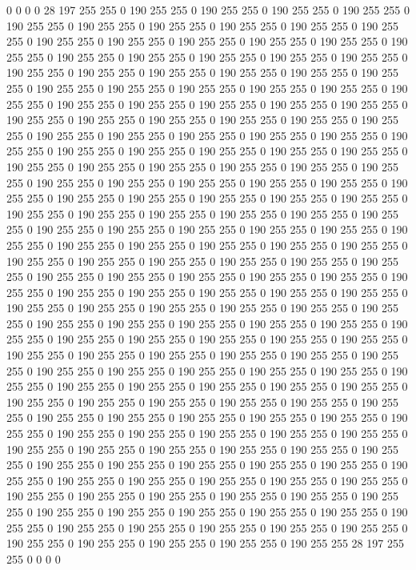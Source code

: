 0 0 0 0 28 197 255 255 0 190 255 255 0 190 255 255 0 190 255 255 0 190 255 255 0 190 255 255 0 190 255 255 0 190 255 255 0 190 255 255 0 190 255 255 0 190 255 255 0 190 255 255 0 190 255 255 0 190 255 255 0 190 255 255 0 190 255 255 0 190 255 255 0 190 255 255 0 190 255 255 0 190 255 255 0 190 255 255 0 190 255 255 0 190 255 255 0 190 255 255 0 190 255 255 0 190 255 255 0 190 255 255 0 190 255 255 0 190 255 255 0 190 255 255 0 190 255 255 0 190 255 255 0 190 255 255 0 190 255 255 0 190 255 255 0 190 255 255 0 190 255 255 0 190 255 255 0 190 255 255 0 190 255 255 0 190 255 255 0 190 255 255 0 190 255 255 0 190 255 255 0 190 255 255 0 190 255 255 0 190 255 255 0 190 255 255 0 190 255 255 
0 190 255 255 0 190 255 255 0 190 255 255 0 190 255 255 0 190 255 255 0 190 255 255 0 190 255 255 0 190 255 255 0 190 255 255 0 190 255 255 0 190 255 255 0 190 255 255 0 190 255 255 0 190 255 255 0 190 255 255 0 190 255 255 0 190 255 255 0 190 255 255 0 190 255 255 0 190 255 255 0 190 255 255 0 190 255 255 0 190 255 255 0 190 255 255 0 190 255 255 0 190 255 255 0 190 255 255 0 190 255 255 0 190 255 255 0 190 255 255 0 190 255 255 0 190 255 255 0 190 255 255 0 190 255 255 0 190 255 255 0 190 255 255 0 190 255 255 0 190 255 255 0 190 255 255 0 190 255 255 0 190 255 255 0 190 255 255 0 190 255 255 0 190 255 255 0 190 255 255 0 190 255 255 0 190 255 255 0 190 255 255 0 190 255 255 0 190 255 255 
0 190 255 255 0 190 255 255 0 190 255 255 0 190 255 255 0 190 255 255 0 190 255 255 0 190 255 255 0 190 255 255 0 190 255 255 0 190 255 255 0 190 255 255 0 190 255 255 0 190 255 255 0 190 255 255 0 190 255 255 0 190 255 255 0 190 255 255 0 190 255 255 0 190 255 255 0 190 255 255 0 190 255 255 0 190 255 255 0 190 255 255 0 190 255 255 0 190 255 255 0 190 255 255 0 190 255 255 0 190 255 255 0 190 255 255 0 190 255 255 0 190 255 255 0 190 255 255 0 190 255 255 0 190 255 255 0 190 255 255 0 190 255 255 0 190 255 255 0 190 255 255 0 190 255 255 0 190 255 255 0 190 255 255 0 190 255 255 0 190 255 255 0 190 255 255 0 190 255 255 0 190 255 255 0 190 255 255 0 190 255 255 0 190 255 255 0 190 255 255 
0 190 255 255 0 190 255 255 0 190 255 255 0 190 255 255 0 190 255 255 0 190 255 255 0 190 255 255 0 190 255 255 0 190 255 255 0 190 255 255 0 190 255 255 0 190 255 255 0 190 255 255 0 190 255 255 0 190 255 255 0 190 255 255 0 190 255 255 0 190 255 255 0 190 255 255 0 190 255 255 0 190 255 255 0 190 255 255 0 190 255 255 0 190 255 255 0 190 255 255 0 190 255 255 0 190 255 255 0 190 255 255 0 190 255 255 0 190 255 255 0 190 255 255 0 190 255 255 0 190 255 255 0 190 255 255 0 190 255 255 0 190 255 255 0 190 255 255 0 190 255 255 0 190 255 255 0 190 255 255 0 190 255 255 0 190 255 255 0 190 255 255 0 190 255 255 0 190 255 255 0 190 255 255 0 190 255 255 0 190 255 255 28 197 255 255 0 0 0 0 
